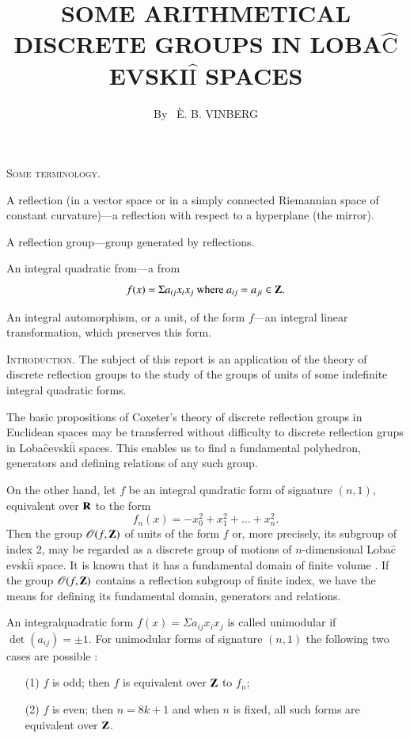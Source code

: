 \title{SOME ARITHMETICAL DISCRETE GROUPS IN LOBA$\hat{\text{C}}$EVSKI$\hat{\text{I}}$ SPACES}

\author{By~ \`E. B. VINBERG}

\date{}
\maketitle

\textsc{Some terminology.}\pageoriginale 

A reflection (in a vector space or in a simply connected Riemannian space of constant curvature)---a reflection with respect to a hyperplane (the mirror).

A reflection group---group generated by reflections. 

An integral quadratic from---a from 
$$
f(x) = \Sigma a_{ij} x_i x_j \text{ where } a_{ij} = a_{ji} \in \mathbf{Z}.
$$

An integral automorphism, or a unit, of the form $f$---an integral linear transformation, which preserves this form.

\textsc{Introduction.} The subject of this report is an application of the theory of discrete reflection groups to the study of the groups of units of some indefinite integral quadratic forms.

The basic propositions of Coxeter's theory of discrete reflection groups in Euclidean spaces \cite{art10-key1} may be transferred without difficulty to discrete reflection grups in Loba$\hat{\text{c}}$evski$\hat{\text{i}}$ spaces. This enables us to find a fundamental polyhedron, generators and defining relations of any such group.

On the other hand, let $f$ be an integral quadratic form of signature $(n,1)$, \ie equivalent over $\mathbf{R}$ to the form 
$$
f_n (x) = - x^2_0 + x^2_1 + \ldots + x^2_n.
$$
Then the group $\mathscr{O}(f, \mathbf{Z})$ of units of the form $f$ or, more precisely, its subgroup of index 2, may be regarded as a discrete group of motions of $n$-dimensional
Loba$\hat{\text{c}}$evski$\hat{\text{i}}$ space. It is known that it has a fundamental domain of finite volume \cite{art10-key2}. If the group $\mathscr{O}(f, \mathbf{Z})$ contains a reflection subgroup of finite index, we have the means for defining its fundamental domain, generators and relations.

An integral\pageoriginale quadratic form $f(x) = \Sigma a_{ij} x_i x_j$ is called unimodular if $\det (a_{ij}) = \pm 1$. For unimodular forms of signature $(n,1)$ the following two cases are possible \cite{art10-key6}:
\begin{itemize}
\item[(1)] $f$ is odd; then $f$ is equivalent over $\mathbf{Z}$ to $f_n$;

\item[(2)] $f$ is even; then $n = 8k +1$ and when $n$ is fixed, all such forms are equivalent over $\mathbf{Z}$.
\end{itemize}

